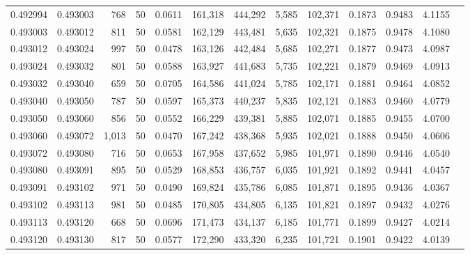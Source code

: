 \begin{tabular}{rrrrrrrrrrrrr}
0.492994 & 0.493003 &   768 &  50 &                                     0.0611 & 161,318 & 444,292 &   5,585 & 102,371 & 0.1873 & 0.9483 & 4.1155 \\
0.493003 & 0.493012 &   811 &  50 &                                     0.0581 & 162,129 & 443,481 &   5,635 & 102,321 & 0.1875 & 0.9478 & 4.1080 \\
0.493012 & 0.493024 &   997 &  50 &                                     0.0478 & 163,126 & 442,484 &   5,685 & 102,271 & 0.1877 & 0.9473 & 4.0987 \\
0.493024 & 0.493032 &   801 &  50 &                                     0.0588 & 163,927 & 441,683 &   5,735 & 102,221 & 0.1879 & 0.9469 & 4.0913 \\
0.493032 & 0.493040 &   659 &  50 &                                     0.0705 & 164,586 & 441,024 &   5,785 & 102,171 & 0.1881 & 0.9464 & 4.0852 \\
0.493040 & 0.493050 &   787 &  50 &                                     0.0597 & 165,373 & 440,237 &   5,835 & 102,121 & 0.1883 & 0.9460 & 4.0779 \\
0.493050 & 0.493060 &   856 &  50 &                                     0.0552 & 166,229 & 439,381 &   5,885 & 102,071 & 0.1885 & 0.9455 & 4.0700 \\
0.493060 & 0.493072 & 1,013 &  50 &                                     0.0470 & 167,242 & 438,368 &   5,935 & 102,021 & 0.1888 & 0.9450 & 4.0606 \\
0.493072 & 0.493080 &   716 &  50 &                                     0.0653 & 167,958 & 437,652 &   5,985 & 101,971 & 0.1890 & 0.9446 & 4.0540 \\
0.493080 & 0.493091 &   895 &  50 &                                     0.0529 & 168,853 & 436,757 &   6,035 & 101,921 & 0.1892 & 0.9441 & 4.0457 \\
0.493091 & 0.493102 &   971 &  50 &                                     0.0490 & 169,824 & 435,786 &   6,085 & 101,871 & 0.1895 & 0.9436 & 4.0367 \\
0.493102 & 0.493113 &   981 &  50 &                                     0.0485 & 170,805 & 434,805 &   6,135 & 101,821 & 0.1897 & 0.9432 & 4.0276 \\
0.493113 & 0.493120 &   668 &  50 &                                     0.0696 & 171,473 & 434,137 &   6,185 & 101,771 & 0.1899 & 0.9427 & 4.0214 \\
0.493120 & 0.493130 &   817 &  50 &                                     0.0577 & 172,290 & 433,320 &   6,235 & 101,721 & 0.1901 & 0.9422 & 4.0139 \\

\end{tabular}
